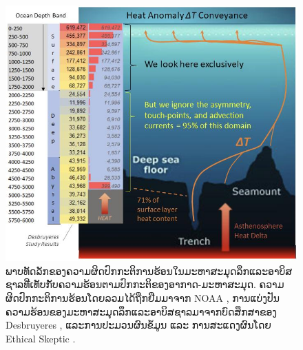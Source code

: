 \documentclass[10pt,twocolumn,letterpaper]{article}
\begin{document}
\begin{figure}[t]
\begin{center}
\includegraphics[width=1\textwidth]{deepsea.jpg}
\end{center}
   \caption{ພາບທັດລັກຂອງຄວາມຜິດປົກກະຕິການຮ້ອນໃນມະຫາສະມຸດລຶກແລະອາບິສຊາລທີ່ເທັບກັບຄວາມຮ້ອນຕາມປົກກະຕິຂອງອາກາດ-ມະຫາສະມຸດ. ຄວາມຜິດປົກກະຕິການຮ້ອນໂດຍລວມໄດ້ຖືກຢືມມາຈາກ NOAA \cite{147}, ການແບ່ງປັນຄວາມຮ້ອນຂອງມະຫາສະມຸດລຶກແລະອາບິສຊາລມາຈາກບົດສຶກສາຂອງ Desbruyeres \cite{132}, ແລະການປະມວນຜົນຂໍ້ມູນ ແລະ ການສະແດງຜົນໂດຍ Ethical Skeptic \cite{129}.}
\label{fig:21}
\end{figure}
\end{document}
